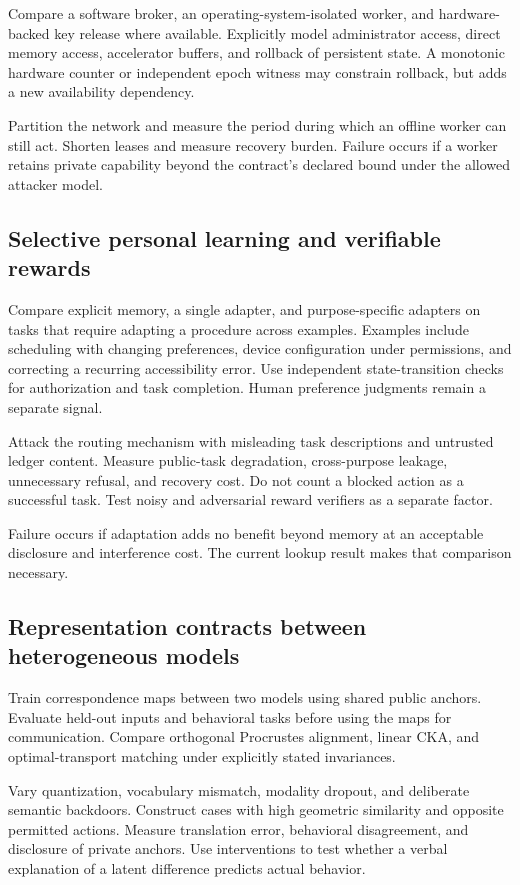 \documentclass[11pt]{article}
\begin{document}
Compare a software broker, an operating-system-isolated worker, and hardware-backed key release where available.
Explicitly model administrator access, direct memory access, accelerator buffers, and rollback of persistent state.
A monotonic hardware counter or independent epoch witness may constrain rollback, but adds a new availability dependency.

Partition the network and measure the period during which an offline worker can still act.
Shorten leases and measure recovery burden.
Failure occurs if a worker retains private capability beyond the contract's declared bound under the allowed attacker model.

\subsection{Selective personal learning and verifiable rewards}
Compare explicit memory, a single adapter, and purpose-specific adapters on tasks that require adapting a procedure across examples.
Examples include scheduling with changing preferences, device configuration under permissions, and correcting a recurring accessibility error.
Use independent state-transition checks for authorization and task completion.
Human preference judgments remain a separate signal.

Attack the routing mechanism with misleading task descriptions and untrusted ledger content.
Measure public-task degradation, cross-purpose leakage, unnecessary refusal, and recovery cost.
Do not count a blocked action as a successful task.
Test noisy and adversarial reward verifiers as a separate factor.

Failure occurs if adaptation adds no benefit beyond memory at an acceptable disclosure and interference cost.
The current lookup result makes that comparison necessary.

\subsection{Representation contracts between heterogeneous models}
Train correspondence maps between two models using shared public anchors.
Evaluate held-out inputs and behavioral tasks before using the maps for communication.
Compare orthogonal Procrustes alignment, linear CKA, and optimal-transport matching under explicitly stated invariances.

Vary quantization, vocabulary mismatch, modality dropout, and deliberate semantic backdoors.
Construct cases with high geometric similarity and opposite permitted actions.
Measure translation error, behavioral disagreement, and disclosure of private anchors.
Use interventions to test whether a verbal explanation of a latent difference predicts actual behavior.
\end{document}
